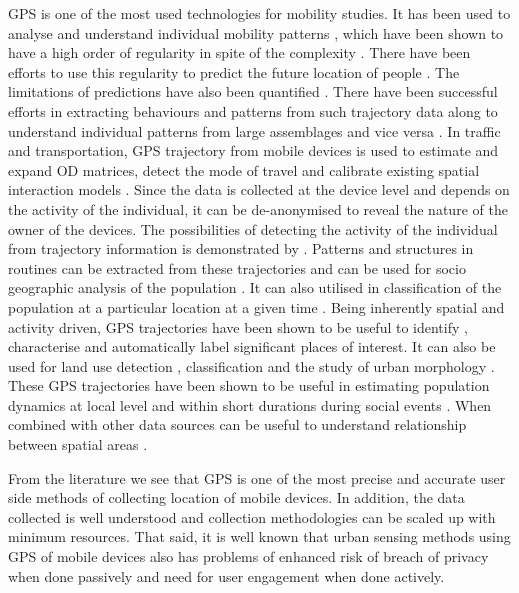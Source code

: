 GPS is one of the most used technologies for mobility studies.
It has been used to analyse and understand individual mobility patterns \citep{gonzalez2008, neuhaus2009}, which have been shown to have a high order of regularity in spite of the complexity \citep{brockmann2006; Song, 2010 b}.
There have been efforts to use this regularity to predict the future location of people \citep{monreale2009, calabrese2010}.
The limitations of predictions have also been quantified \citep{song2010a}.
There have been successful efforts in extracting behaviours and patterns from such trajectory data \citep{liu2010, cho2011, hoteit2013, pappalardo2013} along to understand individual patterns from large assemblages \citep{giannotti2011, calabrese2013} and vice versa \citep{wirz2012}.
In traffic and transportation, GPS trajectory from mobile devices is used to estimate \citep{calabrese2011} and expand \citep{jing2011} OD matrices, detect the mode of travel \citep{gong2012, rossi2015} and calibrate existing spatial interaction models \citep{yue2012}
.
Since the data is collected at the device level and depends on the activity of the individual, it can be de-anonymised to reveal the nature of the owner of the devices.
The possibilities of detecting the activity of the individual from trajectory information is demonstrated by \citep{liao2006, krumm2007}.
Patterns \citep{jiang2012} and structures in routines \citep{eagle2009} can be extracted from these trajectories and can be used for socio geographic analysis of the population \citep{licoppe2008}.
It can also utilised in classification of the population at a particular location at a given time \citep{pappalardo2015}.
Being inherently spatial and activity driven, GPS trajectories have been shown to be useful to identify \citep{bao2012}, characterise \citep{wan2013} and automatically label \citep{do2014} significant places of interest.
It can also be used for land use detection \citep{toole2012}, classification \citep{jiang2015} and the study of urban morphology \citep{kang2012}.
These GPS trajectories have been shown to be useful in estimating population dynamics at local level and within short durations during social events \citep{calabrese2010, kim2014, deville2014}.
When combined with other data sources can be useful to understand relationship between spatial areas \citep{long2015}.

From the literature we see that GPS is one of the most precise and accurate user side methods of collecting location of mobile devices.
In addition, the data collected is well understood and collection methodologies can be scaled up with minimum resources.
That said, it is well known that urban sensing methods using GPS of mobile devices also has problems of enhanced risk of breach of privacy when done passively and need for user engagement when done actively.


